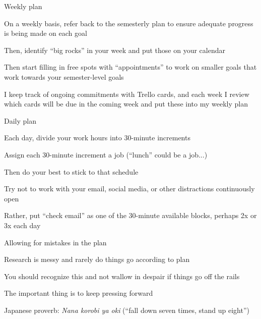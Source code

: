 \documentclass[notes,12pt, aspectratio=169]{beamer}
\newenvironment{wideitemize}{\itemize\addtolength{\itemsep}{15pt}}{\enditemize}
\begin{document}
\begin{frame}{Weekly plan}
\begin{wideitemize}
\item On a weekly basis, refer back to the semesterly plan to ensure adequate progress is being made on each goal
\item Then, identify ``big rocks'' in your week and put those on your calendar
\item Then start filling in free spots with ``appointments'' to work on smaller goals that work towards your semester-level goals
\item I keep track of ongoing commitments with Trello cards, and each week I review which cards will be due in the coming week and put these into my weekly plan
\end{wideitemize}
\end{frame}


\begin{frame}{Daily plan}
\begin{wideitemize}
\item Each day, divide your work hours into 30-minute increments
\item Assign each 30-minute increment a job (``lunch'' could be a job...)
\item Then do your best to stick to that schedule
\item Try not to work with your email, social media, or other distractions continuously open
\item Rather, put ``check email'' as one of the 30-minute available blocks, perhaps 2x or 3x each day
\end{wideitemize}
\end{frame}


\begin{frame}{Allowing for mistakes in the plan}
\begin{wideitemize}
\item Research is messy and rarely do things go according to plan
\item You should recognize this and not wallow in despair if things go off the rails
\item The important thing is to keep pressing forward
\item Japanese proverb: \textit{Nana korobi ya oki} (``fall down seven times, stand up eight'')
\end{wideitemize}
\end{frame}
\end{document}
